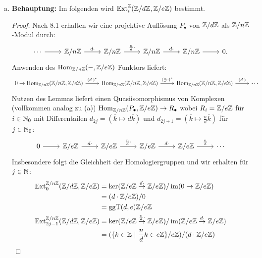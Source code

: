\documentclass{nico_zettelsose21}
\newcommand{\ggt}{\operatorname{ggT}}
\newcommand{\Zn}{\Z/n\Z}
\newcommand{\Ze}{\Z/e\Z}
\newcommand{\Zd}{\Z/d\Z}
\newcommand{\Ext}{\operatorname{Ext}}
\renewcommand{\im}{\operatorname{im}}
\begin{document}
\begin{enumerate}[(a)]
    \item   \textbf{Behauptung:} Im folgenden wird $\Ext_{i}^{\Z}(\Zd,\Ze)$ bestimmt.
            \begin{proof}
                Nach 8.1 erhalten wir eine projektive Auflösung $P_{\bullet}$ von $\Zd$ als $\Zn$-Modul durch: 
                \[
                \begin{tikzcd}
                    \cdots \arrow[r] &\Zn \arrow[r, "d\cdot"] &\Zn \arrow[r, "\frac{n}{d}\cdot"] &\Zn \arrow[r, "d\cdot"] &\Zn \arrow[r] &0.
                \end{tikzcd}
                \]
                Anwenden des $\Hom_{\Zn}(-,\Ze)$ Funktors liefert:
                \[
                    \begin{tikzcd}
                        0 \to \Hom_{\Zn}(\Zn,\Ze) \arrow[r, "(d \cdot)^{*}"] &\Hom_{\Zn}(\Zn,\Ze) \arrow[r, "(\frac{n}{d}\cdot)^{*}"] &\Hom_{\Zn}(\Zn,\Ze) \arrow[r, "(d\cdot)"] &\cdots
                    \end{tikzcd}
                \]
                Nutzen des Lemmas liefert einen Quasiisomorphismus von Komplexen (vollkommen analog zu (a)) 
                $\Hom_{\Zn}(P_{\bullet},\Ze) \to R_{\bullet}$ wobei $R_{i} = \Ze$ für $i \in \mathbb{N}_{0}$ mit Differentailen
                $d_{2j} = (\overline{k} \mapsto d\overline{k})$ und $d_{2j+1} = (\overline{k} \mapsto \frac{n}{d}\overline{k})$ 
                für $j \in \mathbb{N}_{0}$:
                \[
                \begin{tikzcd}
                    0 \arrow[r] &\Ze \arrow[r, "d\cdot"] &\Ze \arrow[r, "\frac{n}{d} \cdot"] &\Ze \arrow[r, "d \cdot"] &\Ze \arrow[r, "\frac{n}{d}"] &\cdots
                \end{tikzcd}
                \]
                Insbesondere folgt die Gleichheit der Homologiergruppen und wir erhalten für $j \in \mathbb{N}$:
                \begin{align*}
                    \Ext_{0}^{\Zn}(\Zd,\Ze) &= \ker(\Ze \stackrel{d \cdot}{\rightarrow} \Ze)/\im(0 \to \Ze) \\
                    &= (d \cdot \Ze)/0 \\
                    &= \ggt(d,e)\Z/e\Z \\
                    \Ext_{2j-1}^{\Zn}(\Zd,\Ze) &= \ker(\Ze \stackrel{\frac{n}{d} \cdot}{\rightarrow} \Ze)/\im(\Ze \stackrel{d \cdot}{\rightarrow} \Ze) \\
                    &= (\{k \in \Z \ | \ \frac{n}{d} k \in e\Z \}/e\Z)/(d \cdot \Ze) \\

\end{align*}
\end{proof}
\end{enumerate}
\end{document}
